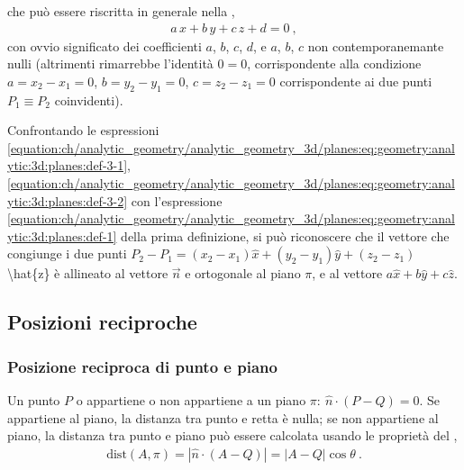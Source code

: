 \documentclass[letterpaper,10pt,italian]{jupyterBook}
\begin{document}
\sphinxAtStartPar
che può essere riscritta in generale nella ,
\begin{equation}\label{equation:ch/analytic_geometry/analytic_geometry_3d/planes:eq:geometry:analytic:3d:planes:def-3-2}
\begin{split}a \, x + b \, y + c \, z + d = 0 \ ,\end{split}
\end{equation}
\sphinxAtStartPar
con ovvio significato dei coefficienti \(a\), \(b\), \(c\), \(d\), e \(a\), \(b\), \(c\) non contemporanemante nulli (altrimenti rimarrebbe l’identità \(0 = 0\), corrispondente alla condizione \(a = x_2 - x_1 = 0\), \(b = y_2 - y_1 = 0\), \(c = z_2 - z_1 = 0\) corrispondente ai due punti \(P_1 \equiv P_2\) coinvidenti).

\sphinxAtStartPar
{} Confrontando le espressioni \eqref{equation:ch/analytic_geometry/analytic_geometry_3d/planes:eq:geometry:analytic:3d:planes:def-3-1}, \eqref{equation:ch/analytic_geometry/analytic_geometry_3d/planes:eq:geometry:analytic:3d:planes:def-3-2} con l’espressione \eqref{equation:ch/analytic_geometry/analytic_geometry_3d/planes:eq:geometry:analytic:3d:planes:def-1} della prima definizione, si può riconoscere che il vettore che congiunge i due punti \(P_2 - P_1 = (x_2 - x_1) \hat{x} + (y_2 - y_1) \hat{y} + (z_2 - z_1)\) \textbackslash{}hat\{z\} è allineato al vettore \(\vec{n}\) e ortogonale al piano \(\pi\), e al vettore \(a \hat{x} + b \hat{y} + c \hat{z}\).


\subsection{Posizioni reciproche}
\label{\detokenize{ch/analytic_geometry/analytic_geometry_3d/planes:posizioni-reciproche}}

\subsubsection{Posizione reciproca di punto e piano}
\label{\detokenize{ch/analytic_geometry/analytic_geometry_3d/planes:posizione-reciproca-di-punto-e-piano}}
\sphinxAtStartPar
Un punto \(P\) o appartiene o non appartiene a un piano \(\pi: \ \hat{n} \cdot (P - Q) = 0\). Se appartiene al piano, la distanza tra punto e retta è nulla; se non appartiene al piano, la distanza tra punto e piano può essere calcolata usando le proprietà
del ,
\begin{equation*}
\begin{split}\text{dist}(A,\pi) = \left| \hat{n} \cdot (A-Q) \right| = |A-Q| \cos \theta \ .\end{split}
\end{equation*}
\sphinxAtStartPar
{} 
\end{document}

